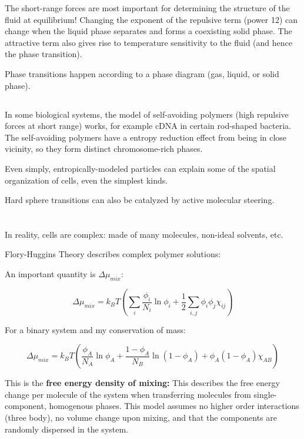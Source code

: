 \documentclass{article}
\begin{document}
The short-range forces are most important for determining the structure of the fluid at equilibrium! Changing the exponent of the repulsive term (power 12) can change when the liquid phase separates and forms a coexisting solid phase. The attractive term also gives rise to temperature sensitivity to the fluid (and hence the phase transition).

Phase transitions happen according to a phase diagram (gas, liquid, or solid phase).

\subsection{}

In some biological systems, the model of self-avoiding polymers (high repulsive forces at short range) works, for example cDNA in certain rod-shaped bacteria. The self-avoiding polymers have a entropy reduction effect from being in close vicinity, so they form distinct chromosome-rich phases.

Even simply, entropically-modeled particles can explain some of the spatial organization of cells, even the simplest kinds.

Hard sphere transitions can also be catalyzed by active molecular steering.

\section{}

\subsection{}

In reality, cells are complex: made of many molecules, non-ideal solvents, etc.

Flory-Huggins Theory describes complex polymer solutions:

An important quantity is $\Delta \mu_{mix}$:

\[\Delta\mu_{mix}=k_B T\left( \sum_i \frac{\phi_i}{N_i}\ln \phi_i + \frac{1}{2}\sum_{i,j} \phi_i \phi_j \chi_{ij}\right)\]

For a binary system and my conservation of mass:

\[\Delta\mu_{mix}=k_B T\left( \frac{\phi_A}{N_A}\ln \phi_A + \frac{1-\phi_A}{N_B}\ln (1-\phi_A) + \phi_A (1-\phi_A) \chi_{AB}\right)\]

This is the \textbf{free energy density of mixing:} This describes the free energy change per molecule of the system when transferring molecules from single-component, homogenous phases. This model assumes no higher order interactions (three body), no volume change upon mixing, and that the components are randomly dispersed in the system.
\end{document}
